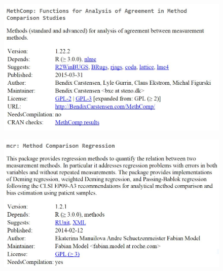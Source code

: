 \documentclass[compress]{beamer}        %
\begin{document}
\begin{frame}
	
	\begin{figure}
		\centering
		\includegraphics[width=1.05\linewidth]{images/CRAN-MethComp}

	\end{figure}
	
\end{frame}
\begin{frame}
\begin{figure}
\centering
\includegraphics[width=1.05\linewidth]{images/CRAN-mcr}

\end{figure}
\end{frame}
\end{document}

